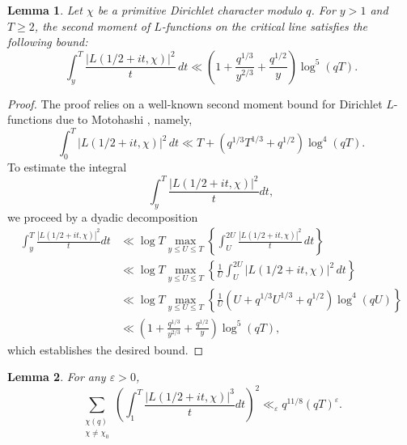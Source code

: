 \documentclass[oneside,reqno,10pt]{amsart}
\numberwithin{equation}{section}
\theoremstyle{plain}
\newtheorem{lemma}{Lemma}
\theoremstyle{definition}
\numberwithin{equation}{section}
\begin{document}
\begin{lemma}\label{bound of L^3}
Let $\chi$ be a primitive Dirichlet character modulo $q$. For $y > 1$ and $T \geq 2$, the second moment of $L$-functions on the critical line satisfies the following bound:
\begin{equation*}
    \int_{y}^{T} \frac{|L(1/2 + it, \chi)|^2}{t} \, dt \ll\left(1 + \frac{q^{1/3}}{y^{2/3}} + \frac{q^{1/2}}{y}\right)\log^5(qT).
\end{equation*}
\end{lemma}
\begin{proof}
The proof relies on a well-known second moment bound for Dirichlet $L$-functions due to Motohashi \cite{Mo}, namely,
  \begin{equation*}
           \int_{0}^{T} |L(1/2 + it, \chi)|^2 \, dt \ll T+( q^{1/3} T^{1/3}+ q^{1/2}) \log^4 (qT).
  \end{equation*}
To estimate the integral 
\begin{equation*}
    \int_{y}^{T} \frac{|L(1/2 + it, \chi)|^2}{t}  dt,
\end{equation*}
we proceed by a dyadic decomposition
\begin{align*}
\int_{y}^{T} \frac{|L(1/2 + it, \chi)|^2}{t}  dt &\ll \log T \max_{y \leq U \leq T} \left\{ \int_{U}^{2U} \frac{|L(1/2 + it, \chi)|^2}{t} \, dt \right\} \\
&\ll \log T \max_{y \leq U \leq T} \left\{ \frac{1}{U} \int_{U}^{2U} |L(1/2 + it, \chi)|^2 \, dt \right\} \\
&\ll \log T \max_{y \leq U \leq T} \left\{ \frac{1}{U} \left( U + q^{1/3} U^{1/3} + q^{1/2} \right)\log^4(qU) \right\} \\
&\ll \left(1 + \frac{q^{1/3}}{y^{2/3}} + \frac{q^{1/2}}{y}\right)\log^5 (qT),
\end{align*}
which establishes the desired bound.
\end{proof}
\begin{lemma}\label{xxxxxx}
For any $\varepsilon>0$, $$\sum_{\substack{\chi(q)\\ \chi\neq \chi_0}}\left(\int_{1}^T\frac{|L(1/2+it,\chi)|^3}{t}dt\right)^2\ll_{\varepsilon} q^{11/8}(qT)^{\varepsilon}.$$
\end{lemma}
\end{document}
